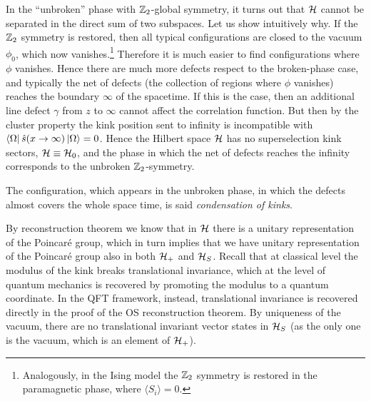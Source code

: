 \documentclass[../main/main.tex]{subfiles}
\begin{document}
In the ``unbroken'' phase with $\mathbb{Z}_2$-global symmetry, it turns out that $\mathcal H$ cannot be separated in the direct sum of two subspaces. Let us show intuitively why. If the $\mathbb{Z}_2$ symmetry is restored, then all typical configurations are closed to the vacuum $\phi_0$, which now vanishes.\footnote{Analogously, in the Ising model the $\mathbb{Z}_2$ symmetry is restored in the paramagnetic phase, where $\langle S_i\rangle=0$.} Therefore it is much easier to find configurations where $\phi$ vanishes. Hence there are much more defects respect to the broken-phase case, and typically the net of defects (the collection of regions where $\phi$ vanishes) reaches the boundary $\infty$ of the spacetime. If this is the case, then an additional line defect $\gamma$ from $z$ to $\infty$ cannot affect the correlation function. 
 But then by the cluster property the kink position sent to infinity is incompatible with $\langle\Omega\vert\,\hat{s}(x\rightarrow\infty)\,\vert\Omega\rangle=0$. Hence the Hilbert space $\mathcal H$ has no superselection kink sectors, $\mathcal H\equiv\mathcal H_0$, and the phase in which the net of defects reaches the infinity corresponds to the unbroken $\mathbb{Z}_2$-symmetry.  

The configuration, which appears in the unbroken phase, in which the defects almost covers the whole space time, is said \emph{condensation of kinks}. 

\skipline

By reconstruction theorem we know that in $\mathcal H$ there is a unitary representation of the Poincaré group, which in turn implies that we have unitary representation of the Poincaré group also in both $\mathcal H_+$ and $\mathcal H_S$.  Recall that at classical level the modulus of the kink breaks translational invariance, which at the level of quantum mechanics is recovered by promoting the modulus to a quantum coordinate. In the QFT framework, instead, translational invariance is recovered directly in the proof of the OS reconstruction theorem.
By uniqueness of the vacuum, there are no translational invariant vector states in $\mathcal H_S$ (as the only one is the vacuum, which is an element of $\mathcal H_+$). 
\end{document}
